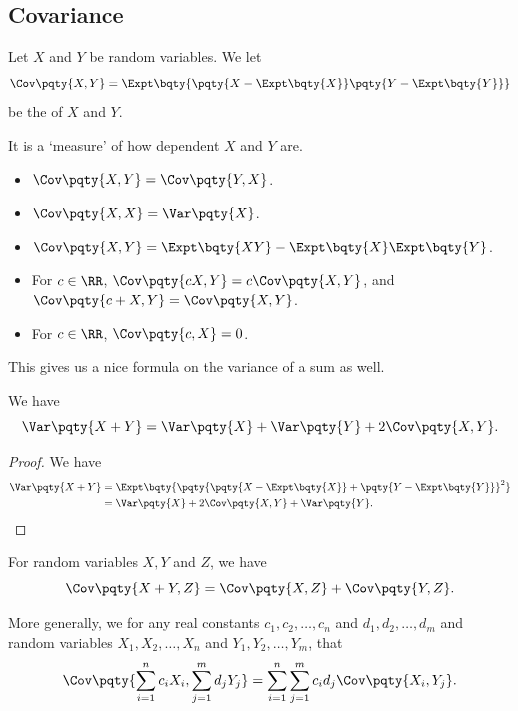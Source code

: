 \subsection{Covariance}

\begin{definition}[Covariance]
    \label{def:covariance}%
    Let \(X\) and \(Y\) be random variables. We let
    \[
        \Cov\pqty{X, Y} = \Expt\bqty{\pqty{X - \Expt\bqty{X}} \pqty{Y - \Expt\bqty{Y}}}
    \]
    be the  of \(X\) and \(Y\).
\end{definition}

It is a `measure' of how dependent \(X\) and \(Y\) are.

\begin{proposition}
    \label{prop:properties-of-covariance}%
    \begin{itemize}
        \item \(\Cov\pqty{X, Y} = \Cov\pqty{Y, X}\). 
        \item \(\Cov\pqty{X, X} = \Var\pqty{X}\).
        \item \(\Cov\pqty{X, Y} = \Expt\bqty{X Y} - \Expt\bqty{X} \Expt\bqty{Y}\).
        \item For \(c \in \RR\), \(\Cov\pqty{cX, Y} = c \Cov\pqty{X, Y}\), and \(\Cov\pqty{c + X, Y} = \Cov\pqty{X, Y}\).
        \item For \(c \in \RR\), \(\Cov\pqty{c, X} = 0\).
    \end{itemize}
\end{proposition}

This gives us a nice formula on the variance of a sum as well.

\begin{proposition}
    \label{prop:variance-of-sum}%
    We have
    \[
        \Var\pqty{X + Y} = \Var\pqty{X} + \Var\pqty{Y} + 2 \Cov\pqty{X, Y}.
    \]    
\end{proposition}

\begin{proof}
    We have
    \begin{align*}
        \Var\pqty{X + Y} &= \Expt\bqty{\pqty{\pqty{X - \Expt\bqty{X}} + \pqty{Y - \Expt\bqty{Y}}}^2} \\
        &= \Var\pqty{X} + 2 \Cov\pqty{X, Y} + \Var\pqty{Y}.
    \end{align*}
\end{proof}

\begin{proposition}
    \label{prop:linearity-of-covariance}%
    For random variables \(X, Y\) and \(Z\), we have
    \[
        \Cov\pqty{X + Y, Z} = \Cov\pqty{X, Z} + \Cov\pqty{Y, Z}.
    \]

    More generally, we for any real constants  \(c_1, c_2, \ldots, c_n\) and \(d_1, d_2, \ldots, d_m\) and random variables \(X_1, X_2, \ldots, X_n\) and \(Y_1, Y_2, \ldots, Y_m\), that
    \[
        \Cov\pqty{\sum_{i = 1}^{n} c_i X_i, \sum_{j = 1}^{m} d_j Y_j} = \sum_{i = 1}^{n} \sum_{j = 1}^{m} c_i d_j \Cov\pqty{X_i, Y_j}.
    \]
\end{proposition}

